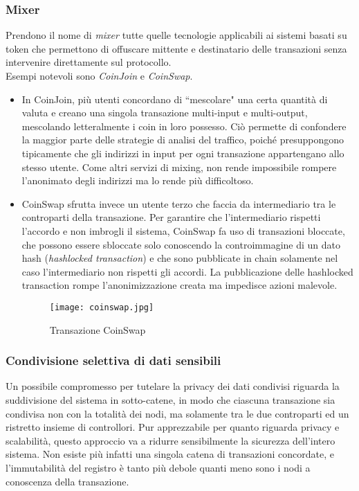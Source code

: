         \subsubsection{Mixer}
            Prendono il nome di \emph{mixer} tutte quelle tecnologie applicabili ai sistemi basati su token che permettono di offuscare mittente e destinatario delle transazioni senza intervenire direttamente sul protocollo. \\
            Esempi notevoli sono \emph{CoinJoin} e \emph{CoinSwap}. \\
            \begin{itemize}
                \item In CoinJoin, più utenti concordano di ``mescolare" una certa quantità di valuta e creano una singola transazione multi-input e multi-output, mescolando letteralmente i coin in loro possesso. Ciò permette di confondere la maggior parte delle strategie di analisi del traffico, poiché presuppongono tipicamente che gli indirizzi in input per ogni transazione appartengano allo stesso utente. Come altri servizi di mixing, non rende impossibile rompere l'anonimato degli indirizzi ma lo rende più difficoltoso.
                \item CoinSwap sfrutta invece un utente terzo che faccia da intermediario tra le controparti della transazione. Per garantire che l'intermediario rispetti l'accordo e non imbrogli il sistema, CoinSwap fa uso di transazioni bloccate, che possono essere sbloccate solo conoscendo la controimmagine di un dato hash (\emph{hashlocked transaction}) e che sono pubblicate in chain solamente nel caso l'intermediario non rispetti gli accordi. La pubblicazione delle hashlocked transaction rompe l'anonimizzazione creata ma impedisce azioni malevole.
                \begin{figure}
                    \centering
                    \texttt{[image: coinswap.jpg]}
                    \caption{Transazione CoinSwap}
                    \label{fig:coinswap}
                \end{figure}
            \end{itemize}
        \subsubsection{Condivisione selettiva di dati sensibili}
            Un possibile compromesso per tutelare la privacy dei dati condivisi riguarda la suddivisione del sistema in sotto-catene, in modo che ciascuna transazione sia condivisa non con la totalità dei nodi, ma solamente tra le due controparti ed un ristretto insieme di controllori. Pur apprezzabile per quanto riguarda privacy e scalabilità, questo approccio va a ridurre sensibilmente la sicurezza dell'intero sistema. Non esiste più infatti una singola catena di transazioni concordate, e l'immutabilità del registro è tanto più debole quanti meno sono i nodi a conoscenza della transazione.
